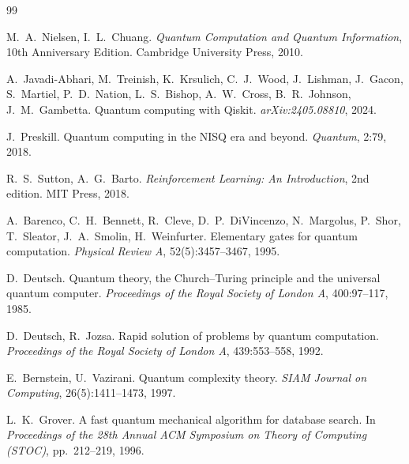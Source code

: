 \begin{thebibliography}{99}

M.~A.~Nielsen, I.~L.~Chuang.
\newblock \emph{Quantum Computation and Quantum Information}, 10th Anniversary Edition.
\newblock Cambridge University Press, 2010.

A.~Javadi-Abhari, M.~Treinish, K.~Krsulich, C.~J.~Wood, J.~Lishman, J.~Gacon, S.~Martiel,
P.~D.~Nation, L.~S.~Bishop, A.~W.~Cross, B.~R.~Johnson, J.~M.~Gambetta.
\newblock Quantum computing with {Qiskit}.
\newblock \emph{arXiv:2405.08810}, 2024.

J.~Preskill.
\newblock Quantum computing in the {NISQ} era and beyond.
\newblock \emph{Quantum}, 2:79, 2018.

R.~S.~Sutton, A.~G.~Barto.
\newblock \emph{Reinforcement Learning: An Introduction}, 2nd edition.
\newblock MIT Press, 2018.

A.~Barenco, C.~H.~Bennett, R.~Cleve, D.~P.~DiVincenzo, N.~Margolus, P.~Shor, T.~Sleator,
J.~A.~Smolin, H.~Weinfurter.
\newblock Elementary gates for quantum computation.
\newblock \emph{Physical Review A}, 52(5):3457--3467, 1995.

D.~Deutsch.
\newblock Quantum theory, the {Church--Turing} principle and the universal quantum computer.
\newblock \emph{Proceedings of the Royal Society of London A}, 400:97--117, 1985.

D.~Deutsch, R.~Jozsa.
\newblock Rapid solution of problems by quantum computation.
\newblock \emph{Proceedings of the Royal Society of London A}, 439:553--558, 1992.

E.~Bernstein, U.~Vazirani.
\newblock Quantum complexity theory.
\newblock \emph{SIAM Journal on Computing}, 26(5):1411--1473, 1997.

L.~K.~Grover.
\newblock A fast quantum mechanical algorithm for database search.
\newblock In \emph{Proceedings of the 28th Annual ACM Symposium on Theory of Computing (STOC)},
pp.~212--219, 1996.


\end{thebibliography}
